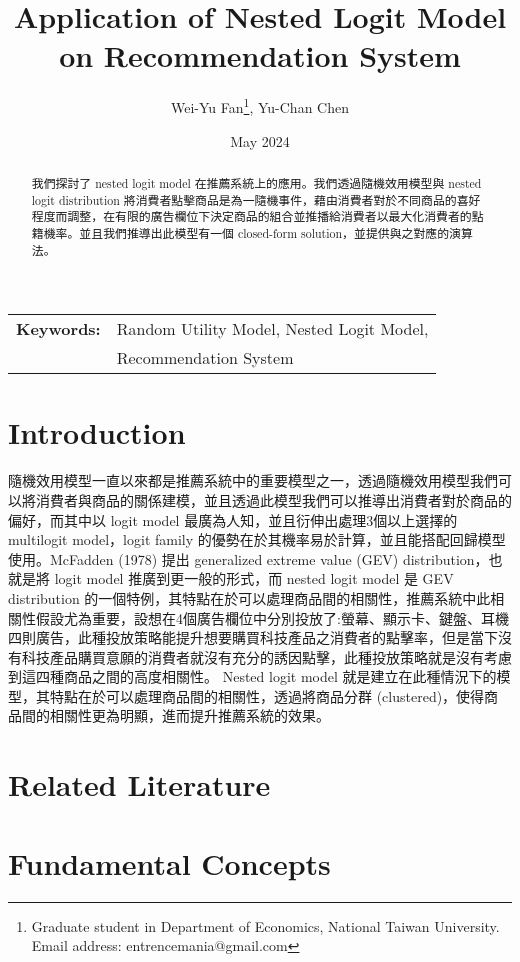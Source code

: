 \documentclass[12pt]{article}
\title{Application of Nested Logit Model on Recommendation System}
\author{Wei-Yu Fan\thanks{
Graduate student in Department of Economics, National Taiwan University.\\ 
Email address: entrencemania@gmail.com
}, Yu-Chan Chen
}
\date{May 2024}
\theoremstyle{definition}
\begin{document}
\maketitle
\begin{sloppypar}
\begin{spacing}{0}
\begin{abstract}
\noindent 我們探討了 nested logit model 在推薦系統上的應用。我們透過隨機效用模型與 nested logit distribution 將消費者點擊商品是為一隨機事件，藉由消費者對於不同商品的喜好程度而調整，在有限的廣告欄位下決定商品的組合並推播給消費者以最大化消費者的點籍機率。並且我們推導出此模型有一個 closed-form solution，並提供與之對應的演算法。
\end{abstract}
\end{spacing}
\begin{tabular}{rl}
\\
\textbf{Keywords:} &Random Utility Model, Nested Logit Model, \\
&Recommendation System
\end{tabular}

\newpage


\section{Introduction}
隨機效用模型一直以來都是推薦系統中的重要模型之一，透過隨機效用模型我們可以將消費者與商品的關係建模，並且透過此模型我們可以推導出消費者對於商品的偏好，而其中以 logit model 最廣為人知，並且衍伸出處理3個以上選擇的 multilogit model，logit family 的優勢在於其機率易於計算，並且能搭配回歸模型使用。McFadden (1978) 提出 generalized extreme value (GEV) distribution，也就是將 logit model 推廣到更一般的形式，而 nested logit model 是 GEV distribution 的一個特例，其特點在於可以處理商品間的相關性，推薦系統中此相關性假設尤為重要，設想在4個廣告欄位中分別投放了:螢幕、顯示卡、鍵盤、耳機四則廣告，此種投放策略能提升想要購買科技產品之消費者的點擊率，但是當下沒有科技產品購買意願的消費者就沒有充分的誘因點擊，此種投放策略就是沒有考慮到這四種商品之間的高度相關性。
\indent Nested logit model 就是建立在此種情況下的模型，其特點在於可以處理商品間的相關性，透過將商品分群 (clustered)，使得商品間的相關性更為明顯，進而提升推薦系統的效果。\\

\section{Related Literature}

\section{Fundamental Concepts}

\end{sloppypar}
\end{document}
